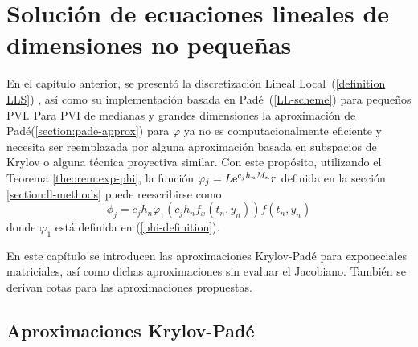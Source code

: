 \chapter{Solución de ecuaciones lineales de dimensiones no pequeñas}\label{chapter:solve-non-smal-lineal-eq}

En el capítulo anterior, se presentó la discretización Lineal Local~(\ref{definition LLS}) , así como su implementación basada en Padé~(\ref{LL-scheme}) para pequeños PVI. Para PVI de medianas y grandes dimensiones la aproximación de Padé(\ref{section:pade-approx}) para $\varphi$ ya no es computacionalmente eficiente y necesita ser reemplazada por alguna aproximación basada en subspacios de Krylov o alguna técnica proyectiva similar. Con este propósito, utilizando el Teorema \ref{theorem:exp-phi}, la función $\varphi_j=L\mathrm{e}^{c_jh_nM_n}r$ definida en la sección \ref{section:ll-methods} puede reescribirse como
\begin{equation*}
    \phi_j=c_jh_n\varphi_1(c_jh_nf_x(t_n,y_n))f(t_n,y_n)
\end{equation*}
donde $\varphi_1$ está definida en (\ref{phi-definition}).

En este capítulo se introducen las aproximaciones Krylov-Padé para exponeciales matriciales, así como dichas aproximaciones sin evaluar el Jacobiano. También se derivan cotas para las aproximaciones propuestas.

\section{Aproximaciones Krylov-Padé}\label{section:krylov-pade-approx}

